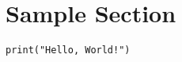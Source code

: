\documentclass{article}
\begin{document}
\section{Sample Section}

\begin{lstlisting}[caption=Sample Code]
print("Hello, World!")
\end{lstlisting}

\end{document}
